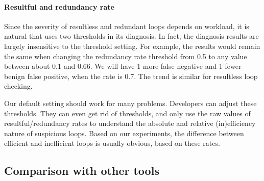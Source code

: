 \paragraph{Resultful and redundancy rate}
Since the severity of resultless and redundant loops depends on
workload, it is natural that \Tool uses two thresholds in its diagnosis.
In fact, the diagnosis results are largely insensitive to the threshold
setting. For example, the results would remain the same when
changing the redundancy rate threshold from 0.5 to any value between about
0.1 and 0.66. We will have 1 more false negative and 1 fewer benign false positive, 
when the rate is 0.7. The trend is similar for resultless
loop checking. 

Our default setting %
should work for many problems.
Developers can adjust these thresholds. 
They can even get rid of thresholds, and only
use the raw values of resultful/redundancy rates to understand
the absolute and relative (in)efficiency nature of suspicious 
loops. Based on our experiments, the difference between efficient and inefficient
loops is usually obvious, based on these rates.

\subsection{Comparison with other tools}

